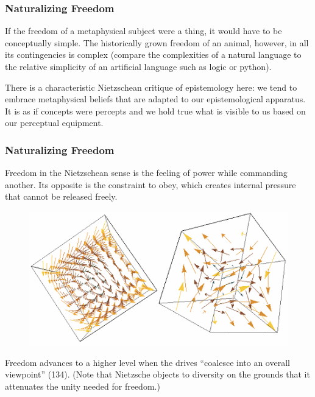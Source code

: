 \documentclass[xcolor=dvipsnames]{beamer}
\begin{document}
\begin{frame}
  \frametitle{Naturalizing Freedom}
If the freedom of a metaphysical subject were a thing, it would have
to be conceptually simple. The historically grown freedom of an
animal, however, in all its contingencies is complex (compare the
complexities of a natural language to the relative simplicity of an
artificial language such as logic or python).

\bigskip

There is a characteristic Nietzschean critique of epistemology here:
we tend to embrace metaphysical beliefs that are adapted to our
epistemological apparatus. It is as if concepts were percepts and we
hold true what is visible to us based on our perceptual equipment.
\end{frame}

\begin{frame}
  \frametitle{Naturalizing Freedom}
  Freedom in the Nietzschean sense is the feeling of power while
  commanding another. Its opposite is the constraint to obey, which
  creates internal pressure that cannot be released freely.
    \begin{figure}[h]
    \includegraphics[scale=1.2]{./3D-vector-field.png}
  \end{figure}
  Freedom advances to a higher level when the drives ``coalesce into an
  overall viewpoint'' (134). (Note that Nietzsche objects to diversity
  on the grounds that it attenuates the unity needed for freedom.)
\end{frame}

\end{document}
